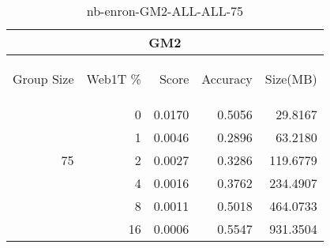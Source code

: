 \begin{center}
\begin{table}[htbp] 
 \begin{center}
\begin{tabular}{ | r | r | r | r | r |}
\hline
\multicolumn{5}{|c|}{GM2}\\
\hline
\begin{sideways}Group Size\end{sideways} & \begin{sideways}Web1T \%\end{sideways} & \begin{sideways}Score\end{sideways} & \begin{sideways}Accuracy\end{sideways} & \begin{sideways}Size(MB)\end{sideways}\\
\hline
\multirow{5}{*}{75}
 & 0 & 0.0170 & 0.5056 & 29.8167\\ \cline{2-5}
 & 1 & 0.0046 & 0.2896 & 63.2180\\ \cline{2-5}
 & 2 & 0.0027 & 0.3286 & 119.6779\\ \cline{2-5}
 & 4 & 0.0016 & 0.3762 & 234.4907\\ \cline{2-5}
 & 8 & 0.0011 & 0.5018 & 464.0733\\ \cline{2-5}
 & 16 & 0.0006 & 0.5547 & 931.3504\\ \cline{2-5}
\hline
\end{tabular}
\caption{nb-enron-GM2-ALL-ALL-75}
\label{table:nb-enron-GM2-ALL-ALL-75}
\end{center}
 \end{table}
\end{center}

